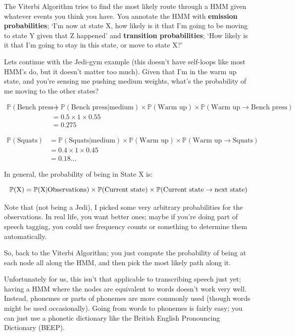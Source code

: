 The Viterbi Algorithm tries to find the most likely route through a HMM given
whatever events you think you have. You annotate the HMM with \textbf{emission
probabilities}; `I'm now at state X, how likely is it that I'm going to be
moving to state Y given that Z happened' and \textbf{transition probabilities};
`How likely is it that I'm going to stay in this state, or move to state X?'

Lets continue with the Jedi-gym example (this doesn't have self-loops like most
HMM's do, but it doesn't matter too much). Given that I'm in the warm up state,
and you're sensing me pushing medium weights, what's the probability of me
moving to the other states?

\[
  \begin{split}
  \mathbb{P}(\text{Bench press}) &=
        \mathbb{P}(\text{Bench press} | \text{medium})  \times
        \mathbb{P}(\text{Warm up}) \times
        \mathbb{P}(\text{Warm up} \rightarrow \text{Bench press})\\
      &= 0.5 \times 1 \times 0.55\\
      &= 0.275
  \end{split}
\]

\[
  \begin{split}
  \mathbb{P}(\text{Squats}) &=
        \mathbb{P}(\text{Squats} | \text{medium})  \times
        \mathbb{P}(\text{Warm up}) \times
        \mathbb{P}(\text{Warm up} \rightarrow \text{Squats})\\
      &= 0.4 \times 1 \times 0.45\\
      &= 0.18\dots
  \end{split}
\]

In general, the probability of being in State X is:

\[
  \mathbb{P}(\text{X}) =
      \mathbb{P}(\text{X} | \text{Observations})  \times
      \mathbb{P}(\text{Current state}) \times
      \mathbb{P}(\text{Current state} \rightarrow \text{next state})\\
\]

Note that (not being a Jedi), I picked some very arbitrary probabilities for the
observations. In real life, you want better ones; maybe if you're doing part of
speech tagging, you could use frequency counts or something to determine them
automatically.

So, back to the Viterbi Algorithm; you just compute the probability of being at
each node all along the HMM, and then pick the most likely path along it.

Unfortunately for us, this isn't that applicable to transcribing speech just
yet; having a HMM where the nodes are equivalent to words doesn't work very
well. Instead, phonemes or parts of phonemes are more commonly used (though
words might be used occasionally). Going from words to phonemes is fairly easy;
you can just use a phonetic dictionary like the British English Pronouncing
Dictionary (BEEP).

